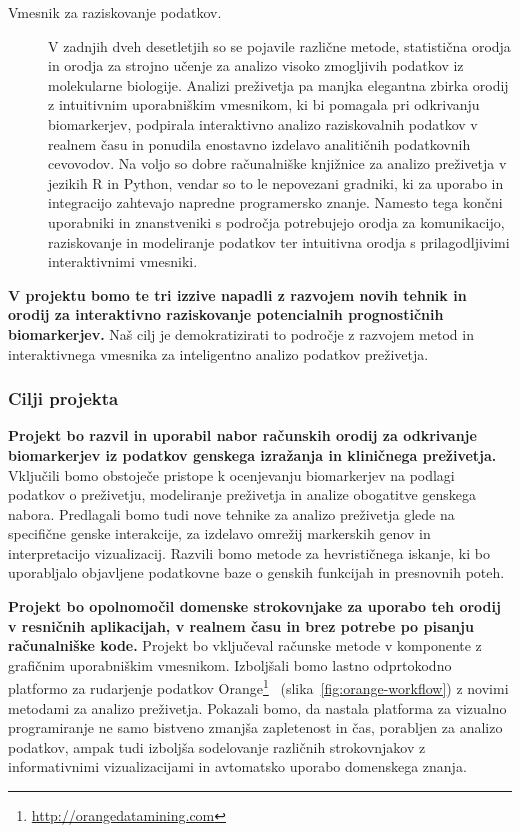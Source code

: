 \documentclass[11pt,a4paper]{article}
\newcommand{\myurl}[1]{\footnote{\url{#1}}}
\renewcommand{\bold}{\textbf}
\begin{document}
\begin{description}
 	\item[Vmesnik za raziskovanje podatkov.] V zadnjih dveh desetletjih so se pojavile različne metode, statistična orodja in orodja za strojno učenje za analizo visoko zmogljivih podatkov iz molekularne biologije. Analizi preživetja pa manjka elegantna zbirka orodij z intuitivnim uporabniškim vmesnikom, ki bi pomagala pri odkrivanju biomarkerjev, podpirala interaktivno analizo raziskovalnih podatkov v realnem času in ponudila enostavno izdelavo analitičnih podatkovnih cevovodov. Na voljo so dobre računalniške knjižnice za analizo preživetja v jezikih R in Python, vendar so to le nepovezani gradniki, ki za uporabo in integracijo zahtevajo napredne programersko znanje. Namesto tega končni uporabniki in znanstveniki s področja potrebujejo orodja za komunikacijo, raziskovanje in modeliranje podatkov ter intuitivna orodja s prilagodljivimi interaktivnimi vmesniki.
\end{description}

\bold{V projektu bomo te tri izzive napadli z razvojem novih tehnik in orodij za interaktivno raziskovanje potencialnih prognostičnih biomarkerjev.} Naš cilj je demokratizirati to področje z razvojem metod in interaktivnega vmesnika za inteligentno analizo podatkov preživetja.

\subsubsection*{Cilji projekta}

\bold{Projekt bo razvil in uporabil nabor računskih orodij za odkrivanje biomarkerjev iz podatkov genskega izražanja in kliničnega preživetja.} Vključili bomo obstoječe pristope k ocenjevanju biomarkerjev na podlagi podatkov o preživetju, modeliranje preživetja in analize obogatitve genskega nabora. Predlagali bomo tudi nove tehnike za analizo preživetja glede na specifične genske interakcije, za izdelavo omrežij markerskih genov in interpretacijo vizualizacij. Razvili bomo metode za hevrističnega iskanje, ki bo uporabljalo objavljene podatkovne baze o genskih funkcijah in presnovnih poteh.

\bold{Projekt bo opolnomočil domenske strokovnjake za uporabo teh orodij v resničnih aplikacijah, v realnem času in brez potrebe po pisanju računalniške kode.} Projekt bo vključeval računske metode v komponente z grafičnim uporabniškim vmesnikom. Izboljšali bomo lastno odprtokodno platformo za rudarjenje podatkov Orange\myurl{http://orangedatamining.com}~\cite{Demsar2013,Curk2005,Godec2019} (slika~\ref{fig:orange-workflow}) z novimi metodami za analizo preživetja. Pokazali bomo, da nastala platforma za vizualno programiranje ne samo bistveno zmanjša zapletenost in čas, porabljen za analizo podatkov, ampak tudi izboljša sodelovanje različnih strokovnjakov z informativnimi vizualizacijami in avtomatsko uporabo domenskega znanja.
\end{document}

